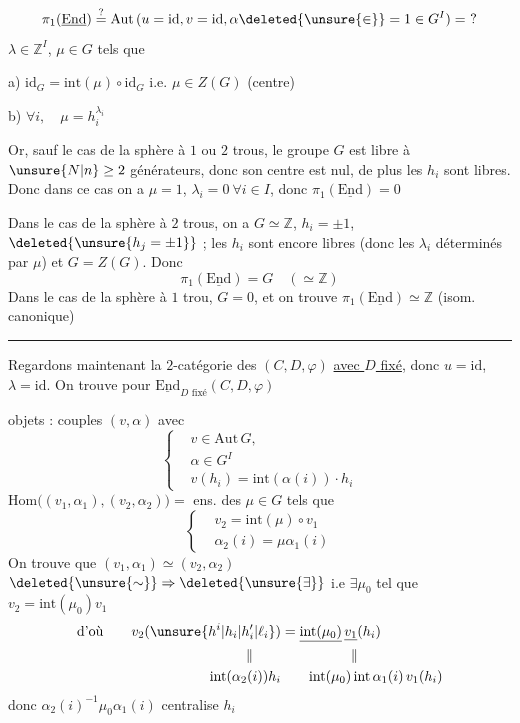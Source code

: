 \[
\pi_1(\underline{\mathrm{End}})\overset{?}{=}
\mathrm{Aut}\,(u=\mathrm{id},v=\mathrm{id},\alpha\deleted{\unsure{\in}}=1\in G^I)=\ ?
\]
$\lambda\in\mathbb Z^I$, $\mu\in G$ tels que

a) $\mathrm{id}_G=\mathrm{int}(\mu)\circ\mathrm{id}_G$ i.e. $\mu\in Z(G)$ (centre)

b) $\forall i,\quad\mu=h_i^{\lambda_i}$

Or, sauf le cas de la sphère à $1$ ou $2$ trous, le groupe $G$ est libre à $\unsure{N|n}\geq2$ générateurs, donc son centre est nul, de plus les $h_i$ sont libres. Donc dans ce cas on a $\mu=1$, $\lambda_i=0\ \forall i\in I$, donc $\boxed{\pi_1(\underline{\mathrm{End}})=0}$

Dans le cas de la sphère à $2$ trous,  on a $G\simeq\mathbb Z$, $h_i=\pm1$, $\deleted{\unsure{h_j=\pm1}}$ ; les $h_i$ sont encore libres (donc les $\lambda_i$ déterminés par $\mu$) et $G=Z(G)$. Donc
\[
\pi_1(\underline{\mathrm{End}})=G\quad(\simeq\mathbb Z)
\]
Dans le cas de la sphère à $1$ trou, $G=0$, et on trouve $\pi_1(\underline{\mathrm{End}})\simeq\mathbb Z$ (isom. canonique)

\begin{center}\rule{1.5cm}{.4pt}\end{center}

Regardons maintenant la $2$-catégorie des $(C,D,\varphi)$ \uline{avec $D$ fixé}, donc $u=\mathrm{id}$, $\lambda=\mathrm{id}$. On trouve pour $\underline{\mathrm{End}}_{D\text{ fixé}}(C,D,\varphi)$

objets : couples $(v,\alpha)$ avec
\[
\left\{\begin{aligned}
&v\in\mathrm{Aut}\,G,\\
&\alpha\in G^I\\
&v(h_i)=\mathrm{int}(\alpha(i))\cdot h_i
\end{aligned}\right.
\]
$\mathrm{Hom}\big((v_1,\alpha_1),(v_2,\alpha_2)\big)={}$ ens. des $\mu\in G$ tels que
\[
\left\{\begin{aligned}
&v_2=\mathrm{int}(\mu)\circ v_1\\
&\alpha_2(i)=\mu\alpha_1(i)
\end{aligned}\right.
\]
On trouve que $(v_1,\alpha_1)\simeq(v_2,\alpha_2)$ $\deleted{\unsure{\sim}}\Rightarrow\deleted{\unsure{\exists}}$   i.e $\exists\mu_0$ tel que $v_2=\mathrm{int}(\mu_0)v_1$
\[
\begin{aligned}
\text{d'où}\qquad v_2(\unsure{h^i|h_i|h'_i|\ell_i})&=\underline{\mathrm{int}(\mu_0)}\,\underline{v_1}(h_i)\\
\Vert\qquad &\hspace{5em}\Vert\\
\mathrm{int}(\alpha_2(i))h_i &\qquad\mathrm{int}(\mu_0)\,\mathrm{int}\,\alpha_1(i)\,v_1(h_i)
\end{aligned}
\]
donc $\alpha_2(i)^{-1}\mu_0\alpha_1(i)$ centralise $h_i$
